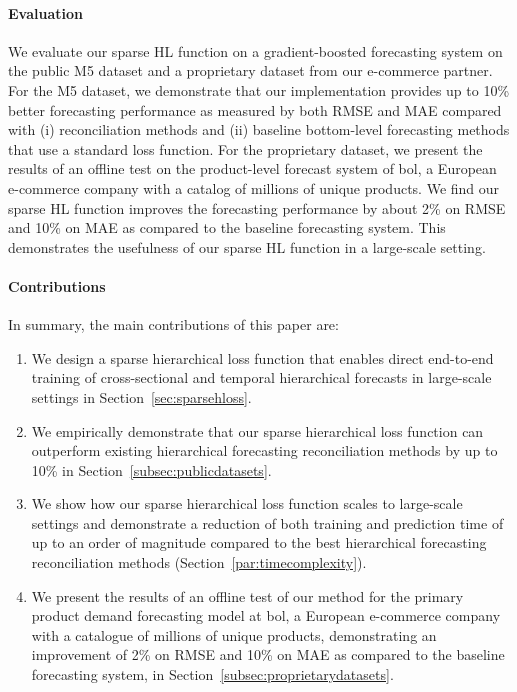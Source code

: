 \documentclass[preprint, 3p, times, twocolumn]{elsarticle}
\begin{document}
\paragraph{Evaluation} We evaluate our sparse HL function on a gradient-boosted forecasting system on the public M5 dataset \cite{makridakis_m5_2022} and a proprietary dataset from our e-commerce partner. For the M5 dataset, we demonstrate that our implementation provides up to 10\% better forecasting performance as measured by both RMSE and MAE compared with (i) reconciliation methods and (ii) baseline bottom-level forecasting methods that use a standard loss function. For the proprietary dataset, we present the results of an offline test on the product-level forecast system of bol, a European e-commerce company with a catalog of millions of unique products. We find our sparse HL function improves the forecasting performance by about 2\% on RMSE and 10\% on MAE as compared to the baseline forecasting system. This demonstrates the usefulness of our sparse HL function in a large-scale setting.

\paragraph{Contributions} In summary, the main contributions of this paper are:
\begin{enumerate}
  \item We design a sparse hierarchical loss function that enables direct end-to-end training of cross-sectional and temporal hierarchical forecasts in large-scale settings in Section~\ref{sec:sparsehloss}.
  \item We empirically demonstrate that our sparse hierarchical loss function can outperform existing hierarchical forecasting reconciliation methods by up to 10\% in Section~\ref{subsec:publicdatasets}.
  \item We show how our sparse hierarchical loss function scales to large-scale settings and demonstrate a reduction of both training and prediction time of up to an order of magnitude compared to the best hierarchical forecasting reconciliation methods (Section~\ref{par:timecomplexity}).
  \item We present the results of an offline test of our method for the primary product demand forecasting model at bol, a European e-commerce company with a catalogue of millions of unique products, demonstrating an improvement of 2\% on RMSE and 10\% on MAE as compared to the baseline forecasting system, in Section~\ref{subsec:proprietarydatasets}.
\end{enumerate}
\end{document}

